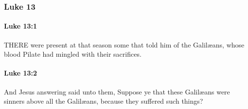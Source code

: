 	\subsubsection{Luke 13} %
		\label{LUKE-13}
		
		\paragraph{Luke 13:1} %
			\label{LUKE-13-1}

			THERE were present at that season some that told him of the Galilæans, whose blood Pilate had mingled with their sacrifices.

			\begin{framed}
			\scriptsize
				\begin{compactdesc}
					\item[SBLG] 
				\end{compactdesc}
			\end{framed}

		\paragraph{Luke 13:2} %
			\label{LUKE-13-2}

			And Jesus answering said unto them, Suppose ye that these Galilæans were sinners above all the Galilæans, because they suffered such things?

